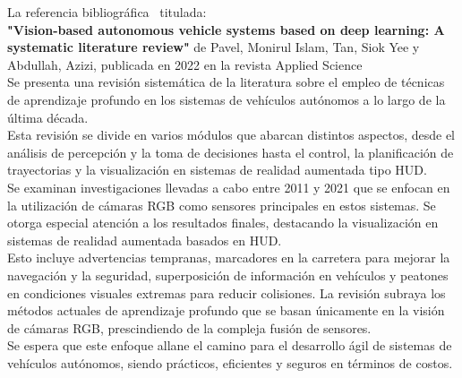 \documentclass[10pt,letterpaper,final]{article}
\begin{document}
\begin{longtable}
\begin{figure}[!ht]
        \end{figure}
        \clearpage
        
        \hline
        \noindent La referencia bibliográfica~\cite{pavel2022vision} titulada:\\
        \textbf{"Vision-based autonomous vehicle systems based on deep learning: A systematic literature review"}
        de Pavel, Monirul Islam, Tan, Siok Yee y Abdullah, Azizi, publicada en 2022 en la revista Applied Science                                                                            \\
        Se presenta una revisión sistemática de la literatura sobre el empleo de técnicas de aprendizaje profundo en los sistemas
        de vehículos autónomos a lo largo de la última década.                                                                    \\Esta revisión se divide en varios módulos que abarcan distintos aspectos,
        desde el análisis de percepción y la toma de decisiones hasta el control, la planificación de trayectorias
        y la visualización en sistemas de realidad aumentada tipo HUD.                                                                                                                   \\
        Se examinan investigaciones llevadas a cabo entre 2011 y 2021 que se enfocan en la utilización de cámaras RGB como sensores principales
        en estos sistemas. Se otorga especial atención a los resultados finales, destacando la visualización en sistemas de realidad aumentada
        basados en HUD.                                                                                                      \\Esto incluye advertencias tempranas, marcadores en la carretera para mejorar la navegación y la seguridad, superposición
        de información en vehículos y peatones en condiciones visuales extremas para reducir colisiones.
        La revisión subraya los métodos actuales de aprendizaje profundo que se basan únicamente en la visión de cámaras RGB, prescindiendo de la
        compleja fusión de sensores.                                                                     \\Se espera que este enfoque allane el camino para el desarrollo ágil de sistemas de vehículos autónomos,
        siendo prácticos, eficientes y seguros en términos de costos.                                                               \\
        \begin{figure}[!ht]

\end{figure}
\end{longtable}
\end{document}
